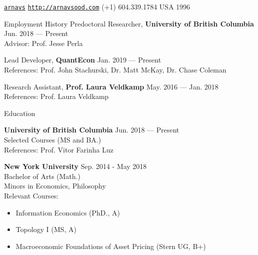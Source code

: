 \documentclass{resume} %
\begin{document}
 \href{https://github.com/arnavs}{\tt arnavs} \vline \hspace{0.5 em} {} \href{http://arnavsood.com}{\tt http://arnavsood.com} \vline \hspace{0.5 em}  (+1) 604.339.1784 \vline \hspace{0.5 em}  USA \vline \hspace{0.5 em}  1996

\begin{rSection}{Employment History}
Predoctoral Researcher, {\bf University of British Columbia} \hfill {Jun. 2018 --- Present} 
\\ Advisor: Prof. Jesse Perla \smallskip 

Lead Developer, {\bf QuantEcon} \hfill {Jan. 2019 --- Present}
\\ References: Prof. John Stachurski, Dr. Matt McKay, Dr. Chase Coleman

Research Assistant, {\bf Prof. Laura Veldkamp} \hfill {May. 2016 --- Jan. 2018}
\\ References: Prof. Laura Veldkamp 
\end{rSection}


\begin{rSection}{Education}

{\bf University of British Columbia} \hfill {Jun. 2018 --- Present} 
\\ Selected Courses (MS and BA.)  %
\\ References: Prof. Vitor Farinha Luz

{\bf New York University} \hfill {Sep. 2014 - May 2018} 
\\ Bachelor of Arts (Math.) %
\\ Minors in Economics, Philosophy 
\\ Relevant Courses: 
\begin{itemize}[noitemsep, nolistsep]
    \item Information Economics (PhD., A) 
    \item Topology I (MS, A)
    \item Macroeconomic Foundations of Asset Pricing (Stern UG, B+)
\end{itemize}

\end{rSection}
\end{document}
